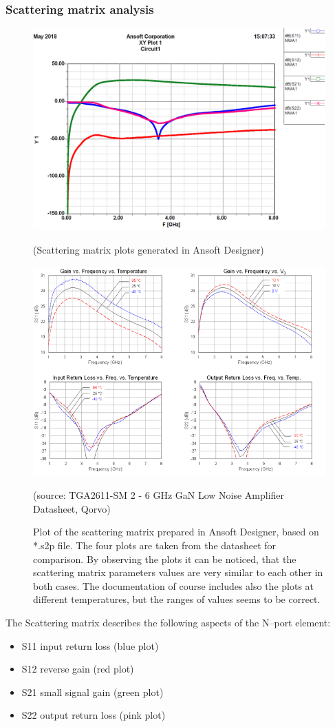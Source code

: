 \documentclass[eng,printmode]{mgr}
\begin{document}
\subsubsection{Scattering matrix analysis}
\begin{figure}[!h]
	\centering
	\includegraphics[width=0.7\linewidth]{chip-plot}
	
	(Scattering matrix plots generated in Ansoft Designer)
	
	\includegraphics[width=0.7\linewidth]{amplifier}
	
	(source: TGA2611-SM 2 - 6 GHz GaN Low Noise Amplifier Datasheet, Qorvo)

	\caption{Plot of the scattering matrix prepared in Ansoft Designer, based on *.s2p file. The four plots are taken from the datasheet for comparison. By observing the plots it can be noticed, that the scattering matrix parameters values are very similar to each other in both cases. The documentation of course includes also the plots at different temperatures, but the ranges of values seems to be correct.}
	\label{fig:chip-plot}
\end{figure}
The Scattering matrix describes the following aspects of the N--port element:
\begin{itemize}\setlength\itemsep{1pt}
\item S11 input return loss  (blue plot)
\item S12 reverse gain       (red plot)
\item S21 small signal gain  (green plot)
\item S22 output return loss (pink plot)
\end{itemize}
\newpage
\end{document}
